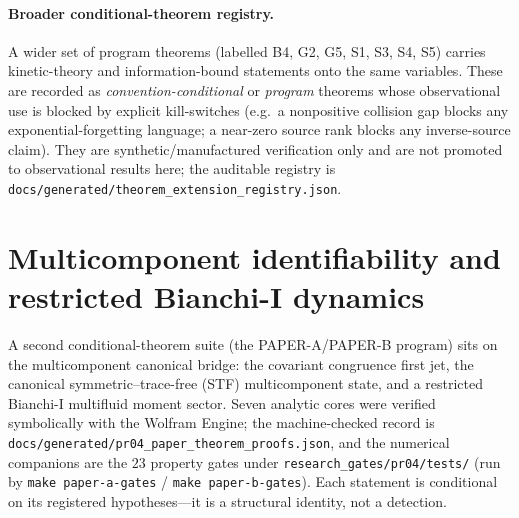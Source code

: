 \documentclass[11pt,a4paper]{article}
\theoremstyle{plain}
\theoremstyle{definition}
\begin{document}
\paragraph{Broader conditional-theorem registry.}
A wider set of program theorems (labelled B4, G2, G5, S1, S3, S4,
S5) carries kinetic-theory and information-bound statements onto the
same variables. These are recorded as \emph{convention-conditional}
or \emph{program} theorems whose observational use is blocked by
explicit kill-switches (e.g.\ a nonpositive collision gap blocks any
exponential-forgetting language; a near-zero source rank blocks any
inverse-source claim). They are synthetic/manufactured verification
only and are not promoted to observational results here; the
auditable registry is
\texttt{docs/generated/theorem\_extension\_registry.json}.

\section{Multicomponent identifiability and restricted Bianchi-I dynamics}
\label{sec:pr04}

A second conditional-theorem suite (the PAPER-A/PAPER-B program)
sits on the multicomponent canonical bridge: the covariant
congruence first jet, the canonical symmetric--trace-free (STF)
multicomponent state, and a restricted Bianchi-I multifluid moment
sector. Seven analytic cores were verified symbolically with the
Wolfram Engine; the machine-checked record is
\texttt{docs/generated/pr04\_paper\_theorem\_proofs.json}, and the
numerical companions are the $23$ property gates under
\texttt{research\_gates/pr04/tests/} (run by \texttt{make
paper-a-gates} / \texttt{make paper-b-gates}). Each statement is
conditional on its registered hypotheses---it is a structural
identity, not a detection.
\end{document}
